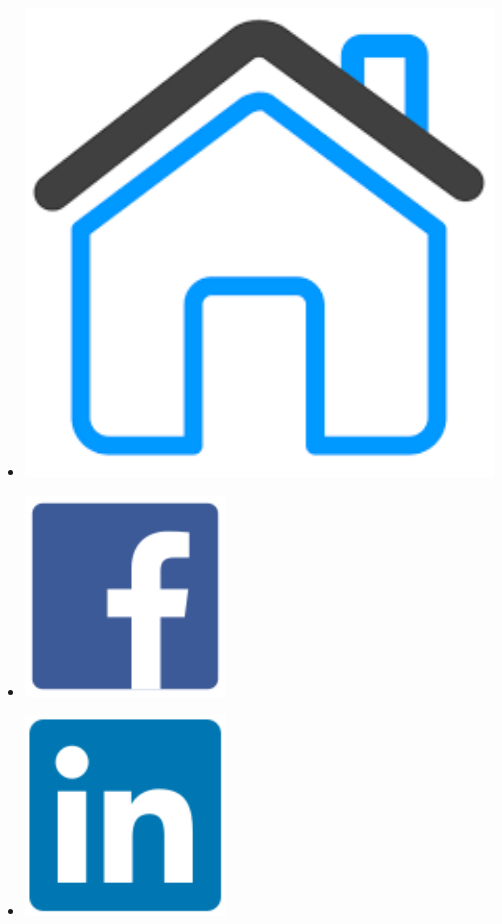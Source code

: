 \documentclass[a4paper,oneside,10pt]{article}
\begin{document}
\begin{multicols}{9}
\begin{itemize}

\item[]\href{https://iosang.github.io}{\includegraphics[scale=0.08]{assets/home.pdf}}

\item[]\href{https://www.facebook.com/metimdjai}{\includegraphics[scale=0.2]{assets/facebook-original.pdf}}

\item[]\href{https://www.linkedin.com/in/iosif-angelidis/}{\includegraphics[scale=0.2]{assets/linkedin-original.pdf}}


\end{itemize}
\end{multicols}
\end{document}
